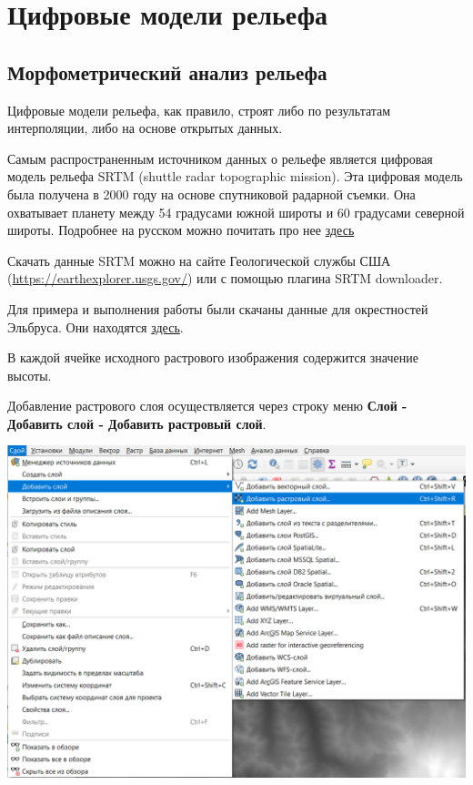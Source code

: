 \documentclass[
]{book}
\begin{document}
\hypertarget{ux446ux438ux444ux440ux43eux432ux44bux435-ux43cux43eux434ux435ux43bux438-ux440ux435ux43bux44cux435ux444ux430}{%
\chapter{Цифровые модели рельефа}\label{ux446ux438ux444ux440ux43eux432ux44bux435-ux43cux43eux434ux435ux43bux438-ux440ux435ux43bux44cux435ux444ux430}}

\hypertarget{ux43cux43eux440ux444ux43eux43cux435ux442ux440ux438ux447ux435ux441ux43aux438ux439-ux430ux43dux430ux43bux438ux437-ux440ux435ux43bux44cux435ux444ux430}{%
\section{Морфометрический анализ рельефа}\label{ux43cux43eux440ux444ux43eux43cux435ux442ux440ux438ux447ux435ux441ux43aux438ux439-ux430ux43dux430ux43bux438ux437-ux440ux435ux43bux44cux435ux444ux430}}

Цифровые модели рельефа, как правило, строят либо по результатам интерполяции, либо на основе открытых данных.

Самым распространенным источником данных о рельефе является цифровая модель рельефа SRTM (shuttle radar topographic mission). Эта цифровая модель была получена в 2000 году на основе спутниковой радарной съемки. Она охватывает планету между 54 градусами южной широты и 60 градусами северной широты. Подробнее на русском можно почитать про нее \href{https://gis-lab.info/qa/srtm.html}{здесь}

Скачать данные SRTM можно на сайте Геологической службы США (\url{https://earthexplorer.usgs.gov/}) или с помощью плагина SRTM downloader.

Для примера и выполнения работы были скачаны данные для окрестностей Эльбруса. Они находятся \href{https://drive.google.com/file/d/1s57yc3rKQbZfFcM8TeWsI6t6HCc7412w/view?usp=sharing}{здесь}.

В каждой ячейке исходного растрового изображения содержится значение высоты.

Добавление растрового слоя осуществляется через строку меню \textbf{Слой - Добавить слой - Добавить растровый слой}.

\includegraphics{figures/65.png}
\end{document}

